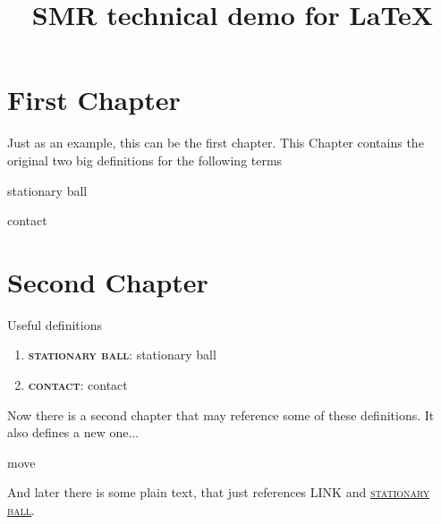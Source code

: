 \documentclass[fontsize=11pt, paper=a4]{report}
\newcommand{\refformat}[1]{{\textsc{#1}}}			 %
\newcommand{\defformat}[1]{{\textbf{\refformat{#1}}}}%
\newcommand{\dtterm}[1]{
\begin{Definition}[name=\defformat{#1}]
	\label{d:#1}
	 \glsdesc*{#1} %
\end{Definition}
}
\newcommand{\dref}[1]{\refformat{\hyperref[d:#1]{#1}}} %
\newcommand{\gref}[1]{{LINK\glossentryname{#1}}} %
\newcommand{\tterm}[1]{
	\defformat{#1}: \glsdesc*{#1} %
}
\newcommand{\recap}[1]{\item{\tterm{#1}}}
\begin{document}
\title{SMR technical demo for \LaTeX}
\maketitle

\pagestyle{plain}%

\chapter{First Chapter}
Just as an example, this can be the first chapter. This Chapter contains the original two big definitions for the following terms
\dtterm{stationary ball}
\dtterm{contact}

\newpage

\chapter{Second Chapter}
Useful definitions
\begin{enumerate}
	\recap{stationary ball}
	\recap{contact}
\end{enumerate}
Now there is a second chapter that may reference some of these definitions. It also defines a new one...
\dtterm{move}
 And later there is some plain text, that just references \gref{move} and \dref{stationary ball}.


\clearpage

\printglossary[title=Definitions, toctitle=List of terms]%
\end{document}
